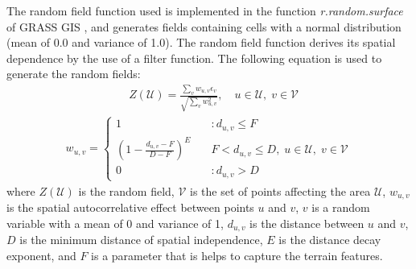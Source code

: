\documentclass[12pt]{article}
\begin{document}
The random field function used is implemented in the
function \textit{r.random.surface} \citep{Ehlschlaeger_1994} of GRASS
GIS \citep{Mitasova1996}, and generates fields containing cells with a normal
distribution (mean of 0.0 and variance of 1.0). The random field
function derives its spatial dependence by the use of a filter
function. The following equation is used to generate the random
fields:
\begin{align}
 &Z(\mathcal{U})= \frac{\sum_v w_{u,v}\epsilon_v}{\sqrt{\sum_v
      w_{u,v}^2}}, \quad u\in \mathcal{U}, \; v \in \mathcal{V}
 \label{eqn1}
 \end{align}
 \begin{align}
  w_{u,v} = \left\{ \begin{array}{ll} 1 & \quad :d_{u,v} \le F
    \\ \left(1- \frac{d_{u,v} - F}{D - F} \right)^E & \quad F <
    d_{u,v} \le D, \; u \in \mathcal{U}, \; v \in \mathcal{V}\\ 0 &
    \quad :d_{u,v} > D
\end{array} \right.
\label{eqn2}                                                    
\end{align}
where $Z(\mathcal{U})$ is the random field, $\mathcal{V}$ is the set
of points affecting the area $\mathcal{U}$, $w_{u,v}$ is the spatial
autocorrelative effect between points $u$ and $v$, $v$ is a random
variable with a mean of 0 and variance of 1, $d_{u,v}$ is the distance
between $u$ and $v$, $D$ is the minimum distance of spatial
independence, $E$ is the distance decay exponent, and $F$ is a
parameter that is helps to capture the terrain features.
\end{document}
